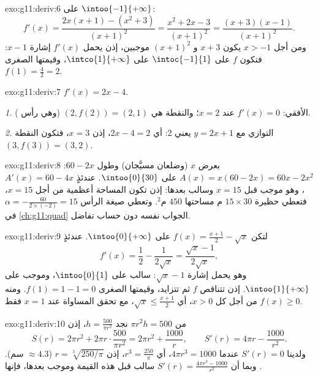\begin{solution}{exo:g11:deriv:6}
على $\intoo{-1}{+\infty}$:
\[
f'(x) = \frac{2x(x+1) - (x^2+3)}{(x+1)^2}
= \frac{x^2 + 2x - 3}{(x+1)^2}
= \frac{(x+3)(x-1)}{(x+1)^2}.
\]
ومن أجل $x > -1$ يكون $x + 3$ و $(x+1)^2$ موجبين، إذن يحمل $f'(x)$
إشارة $x - 1$: فتكون $f$  على $\intoc{-1}{1}$  على
$\intco{1}{+\infty}$، وقيمتها الصغرى $f(1) = \frac{4}{2} = 2$.
\end{solution}

\begin{solution}{exo:g11:deriv:7}
$f'(x) = 2x - 4$.

\emph{1.}  الأفقي: $f'(x) = 0$ عند $x = 2$؛ والنقطة هي
$(2, f(2)) = (2, 1)$ (وهي رأس ).

\emph{2.} التوازي مع $y = 2x + 1$ يعني  $2$: أي $2x - 4 = 2$، إذن
$x = 3$، فتكون النقطة $(3, f(3)) = (3, 2)$.
\end{solution}

\begin{solution}{exo:g11:deriv:8}
بعرض $x$ (وضلعان مسيَّجان) وطول $60 - 2x$:
$A(x) = x(60 - 2x) = 60x - 2x^2$ على $\intoo{0}{30}$. عندئذٍ
$A'(x) = 60 - 4x$، وهو موجب قبل $x = 15$ وسالب بعدها: إذن تكون المساحة
أعظمية من أجل $x = 15$، فتعطي حظيرة $15 \times 30$ م مساحتها
$450$ م$^2$. وتعطي صيغة الرأس $\alpha = -\frac{60}{2 \times (-2)} = 15$
في \cref{ch:g11:quad} الجواب نفسه دون حساب تفاضل.
\end{solution}

\begin{solution}{exo:g11:deriv:9}
لتكن $f(x) = \frac{x+1}{2} - \sqrt x$ على $\intoo{0}{+\infty}$. عندئذٍ
\[
f'(x) = \frac12 - \frac{1}{2\sqrt x} = \frac{\sqrt x - 1}{2\sqrt x},
\]
وهو يحمل إشارة $\sqrt x - 1$: سالب على $\intoo{0}{1}$، وموجب
على $\intoo{1}{+\infty}$. إذن تتناقص $f$ ثم تتزايد، وقيمتها الصغرى
$f(1) = 1 - 1 = 0$. ومنه $f(x) \geq 0$ من أجل كل $x > 0$، أي
$\sqrt x \leq \frac{x+1}{2}$، مع تحقق المساواة عند $x = 1$ فقط.
\end{solution}

\begin{solution}{exo:g11:deriv:10}
من $\pi r^2 h = 500$ نجد $h = \frac{500}{\pi r^2}$، إذن
\[
S(r) = 2\pi r^2 + 2\pi r \cdot \frac{500}{\pi r^2}
= 2\pi r^2 + \frac{1000}{r},
\qquad
S'(r) = 4\pi r - \frac{1000}{r^2}.
\]
ولدينا $S'(r) = 0$ عندما $4\pi r^3 = 1000$، أي $r^3 = \frac{250}{\pi}$، إذن
$r = \sqrt[3]{250/\pi}$ ($\approx 4.3$ سم). وبما أن $S'(r) =
\frac{4\pi r^3 - 1000}{r^2}$ سالب قبل هذه القيمة وموجب
بعدها، فإنها .
\end{solution}

